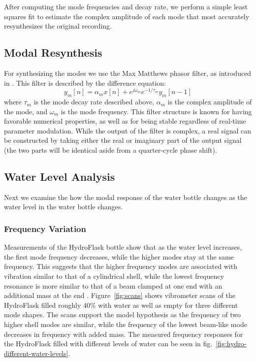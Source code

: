 \documentclass[twoside,a4paper]{article}
\begin{document}
After computing the mode frequencies and decay
rate, we perform a simple least squares fit to
estimate the complex amplitude of each mode that
most accurately resynthesizes the original recording.


%
\subsection{Modal Resynthesis} \label{sec:synthesis}
%
For synthesizing the modes we use the Max Matthews
phasor filter, as introduced in \cite{phasorfilter}.
This filter is described by the difference equation:
\begin{equation}
    y_m[n] = \alpha_m x[n] + e^{j\omega_m} e^{-1/\tau_m} y_m[n-1]
    \label{eq:phasor}
\end{equation}
%
where $\tau_m$ is the mode decay rate described above,
$\alpha_m$ is the complex amplitude of the mode, and $\omega_m$
is the mode frequency. This filter structure is known for
having favorable numerical properties, as well as for being
stable regardless of real-time parameter modulation.
While the output of the filter is complex, a real signal can
be constructed by taking either the real or imaginary part of
the output signal (the two parts will be identical aside from
a quarter-cycle phase shift).

\subsection{Water Level Analysis} \label{sec:water}
%
Next we examine the how the modal response of the water bottle
changes as the water level in the water bottle changes. 
%
\subsubsection{Frequency Variation} \label{sec:water-freq}
%

Measurements of the HydroFlask bottle show that as the water
level increases, the first mode frequency decreases, while the
higher modes stay at the same frequency. This suggests that the higher frequency modes are associated with vibration similar to that of a cylindrical shell, while the lowest frequency resonance is more similar to that of a beam clamped at one end with an additional mass at the end \cite{qatu2004vibration}. Figure~\ref{fig:scans} shows vibrometer scans of the HydroFlask filled roughly 40\% with water as well as empty for three different mode shapes. The scans support the model hypothesis as the frequency of two higher shell modes are similar, while the frequency of the lowest beam-like mode decreases in frequency with added mass. The measured frequency responses for the HydroFlask filled with different levels of water can be seen in fig.~\ref{fig:hydro-different-water-levels}.
\end{document}
